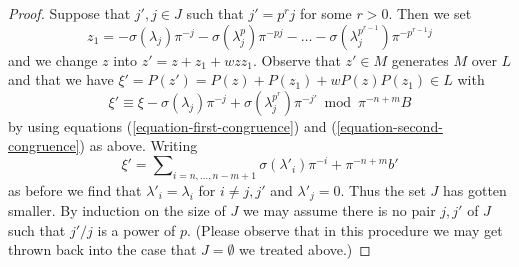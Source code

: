 \begin{proof}
\medskip\noindent
Suppose that $j', j \in J$ such that $j' = p^r j$ for some $r > 0$.
Then we set
$$
z_1 = - \sigma(\lambda_j) \pi^{-j} - \sigma(\lambda_j^p) \pi^{-pj} -
\ldots - \sigma(\lambda_j^{p^{r - 1}}) \pi^{-p^{r - 1}j}
$$
and we change $z$ into $z' = z + z_1 + wzz_1$. Observe that $z' \in M$
generates $M$ over $L$ and that we have
$\xi' = P(z') = P(z) + P(z_1) + wP(z)P(z_1) \in L$ with
$$
\xi' \equiv
\xi - \sigma(\lambda_j) \pi^{-j} + \sigma(\lambda_j^{p^r}) \pi^{-j'}
\bmod \pi^{-n + m}B
$$
by using equations (\ref{equation-first-congruence}) and
(\ref{equation-second-congruence}) as above. Writing
$$
\xi' = \sum\nolimits_{i = n, \ldots, n - m + 1} \sigma(\lambda'_i) \pi^{-i}
+ \pi^{-n + m}b'
$$
as before we find that
$\lambda'_i = \lambda_i$ for $i \not = j, j'$ and $\lambda'_j = 0$.
Thus the set $J$ has gotten smaller.
By induction on the size of $J$ we may assume there is no pair
$j, j'$ of $J$ such that $j'/j$ is a power of $p$.
(Please observe that in this procedure we may get thrown back into the case
that $J = \emptyset$ we treated above.)


\end{proof}
